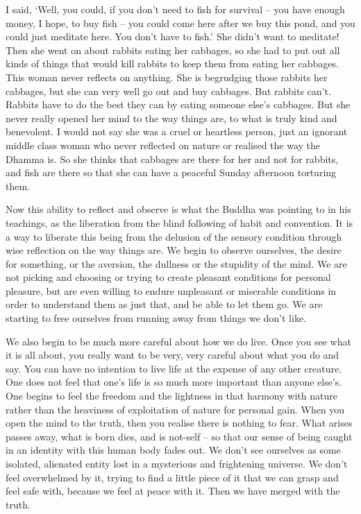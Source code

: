 I said, `Well, you could, if you don't need to fish for survival -- you have enough money, I hope, to buy fish -- you could come here after we buy this pond, and you could just meditate here. You don't have to fish.' She didn't want to meditate! Then she went on about rabbits eating her cabbages, so she had to put out all kinds of things that would kill rabbits to keep them from eating her cabbages. This woman never reflects on anything. She is begrudging those rabbits her cabbages, but she can very well go out and buy cabbages. But rabbits can't. Rabbits have to do the best they can by eating someone else's cabbages. But she never really opened her mind to the way things are, to what is truly kind and benevolent. I would not say she was a cruel or heartless person, just an ignorant middle class woman who never reflected on nature or realised the way the Dhamma is. So she thinks that cabbages are there for her and not for rabbits, and fish are there so that she can have a peaceful Sunday afternoon torturing them.

Now this ability to reflect and observe is what the Buddha was pointing to in his teachings, as the liberation from the blind following of habit and convention. It is a way to liberate this being from the delusion of the sensory condition through wise reflection on the way things are. We begin to observe ourselves, the desire for something, or the aversion, the dullness or the stupidity of the mind. We are not picking and choosing or trying to create pleasant conditions for personal pleasure, but are even willing to endure unpleasant or miserable conditions in order to understand them as just that, and be able to let them go. We are starting to free ourselves from running away from things we don't like.

We also begin to be much more careful about how we do live. Once you see what it is all about, you really want to be very, very careful about what you do and say. You can have no intention to live life at the expense of any other creature. One does not feel that one's life is so much more important than anyone else's. One begins to feel the freedom and the lightness in that harmony with nature rather than the heaviness of exploitation of nature for personal gain. When you open the mind to the truth, then you realise there is nothing to fear. What arises passes away, what is born dies, and is not-self -- so that our sense of being caught in an identity with this human body fades out. We don't see ourselves as some isolated, alienated entity lost in a mysterious and frightening universe. We don't feel overwhelmed by it, trying to find a little piece of it that we can grasp and feel safe with, because we feel at peace with it. Then we have merged with the truth.



